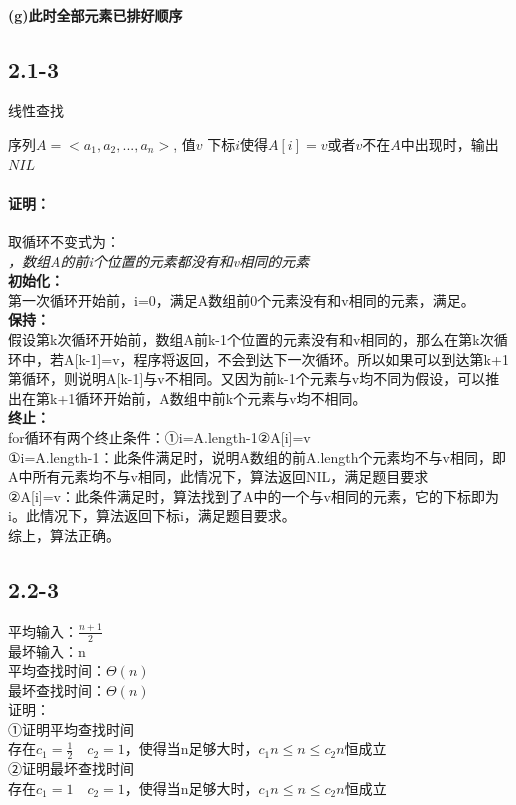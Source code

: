 \documentclass[UTF8]{ctexart}
\begin{document}
\paragraph{(g)此时全部元素已排好顺序}
\subsection{2.1-3}
\renewcommand{\algorithmicrequire}{\textbf{输入:}}
\renewcommand{\algorithmicensure}{\textbf{输出:}}
\begin{algorithm}
	\caption{线性查找}
	\begin{algorithmic}[1]%
	\Require 序列$A=<a_1, a_2, ..., a_n>$, 值$v$
	\Ensure 下标$i$使得$A[i]=v$或者$v$不在$A$中出现时，输出$NIL$
			\State {}
		\EndIf
	\EndFor
	\State {}
	\end{algorithmic}
\end{algorithm}
\paragraph{证明：\\}
取循环不变式为：\\\emph{ ，数组A的前i个位置的元素都没有和v相同的元素}\\
\textbf{初始化：\\}第一次循环开始前，i=0，满足A数组前0个元素没有和v相同的元素，满足。
\textbf{\\保持：\\}假设第k次循环开始前，数组A前k-1个位置的元素没有和v相同的，那么在第k次循环中，若A[k-1]=v，程序将返回，不会到达下一次循环。所以如果可以到达第k+1第循环，则说明A[k-1]与v不相同。又因为前k-1个元素与v均不同为假设，可以推出在第k+1循环开始前，A数组中前k个元素与v均不相同。
\textbf{\\终止：\\}for循环有两个终止条件：①i=A.length-1②A[i]=v\\
①i=A.length-1：此条件满足时，说明A数组的前A.length个元素均不与v相同，即A中所有元素均不与v相同，此情况下，算法返回NIL，满足题目要求\\
②A[i]=v：此条件满足时，算法找到了A中的一个与v相同的元素，它的下标即为i。此情况下，算法返回下标i，满足题目要求。\\
综上，算法正确。

\subsection{2.2-3}
平均输入：$\frac{n+1}{2}$\\
最坏输入：n\\
平均查找时间：{$\Theta(n)$}\\
最坏查找时间：{$\Theta(n)$}\\
证明：\\
①证明平均查找时间\\
存在$c_1=\frac{1}{2}\quad c_2=1$，使得当n足够大时，$c_1n \leq n \leq c_2n$恒成立\\
②证明最坏查找时间\\
存在$c_1=1\quad c_2=1$，使得当n足够大时，$c_1n \leq n \leq c_2n$恒成立
\end{document}
